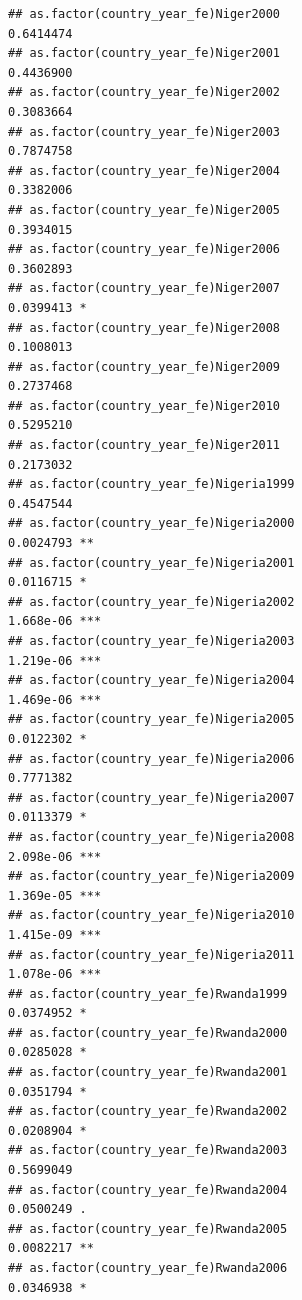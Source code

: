 \documentclass[
  a4paper,
]{article}
\begin{document}
\begin{verbatim}
## as.factor(country_year_fe)Niger2000                            0.6414474    
## as.factor(country_year_fe)Niger2001                            0.4436900    
## as.factor(country_year_fe)Niger2002                            0.3083664    
## as.factor(country_year_fe)Niger2003                            0.7874758    
## as.factor(country_year_fe)Niger2004                            0.3382006    
## as.factor(country_year_fe)Niger2005                            0.3934015    
## as.factor(country_year_fe)Niger2006                            0.3602893    
## as.factor(country_year_fe)Niger2007                            0.0399413 *  
## as.factor(country_year_fe)Niger2008                            0.1008013    
## as.factor(country_year_fe)Niger2009                            0.2737468    
## as.factor(country_year_fe)Niger2010                            0.5295210    
## as.factor(country_year_fe)Niger2011                            0.2173032    
## as.factor(country_year_fe)Nigeria1999                          0.4547544    
## as.factor(country_year_fe)Nigeria2000                          0.0024793 ** 
## as.factor(country_year_fe)Nigeria2001                          0.0116715 *  
## as.factor(country_year_fe)Nigeria2002                          1.668e-06 ***
## as.factor(country_year_fe)Nigeria2003                          1.219e-06 ***
## as.factor(country_year_fe)Nigeria2004                          1.469e-06 ***
## as.factor(country_year_fe)Nigeria2005                          0.0122302 *  
## as.factor(country_year_fe)Nigeria2006                          0.7771382    
## as.factor(country_year_fe)Nigeria2007                          0.0113379 *  
## as.factor(country_year_fe)Nigeria2008                          2.098e-06 ***
## as.factor(country_year_fe)Nigeria2009                          1.369e-05 ***
## as.factor(country_year_fe)Nigeria2010                          1.415e-09 ***
## as.factor(country_year_fe)Nigeria2011                          1.078e-06 ***
## as.factor(country_year_fe)Rwanda1999                           0.0374952 *  
## as.factor(country_year_fe)Rwanda2000                           0.0285028 *  
## as.factor(country_year_fe)Rwanda2001                           0.0351794 *  
## as.factor(country_year_fe)Rwanda2002                           0.0208904 *  
## as.factor(country_year_fe)Rwanda2003                           0.5699049    
## as.factor(country_year_fe)Rwanda2004                           0.0500249 .  
## as.factor(country_year_fe)Rwanda2005                           0.0082217 ** 
## as.factor(country_year_fe)Rwanda2006                           0.0346938 *  

\end{verbatim}
\end{document}

